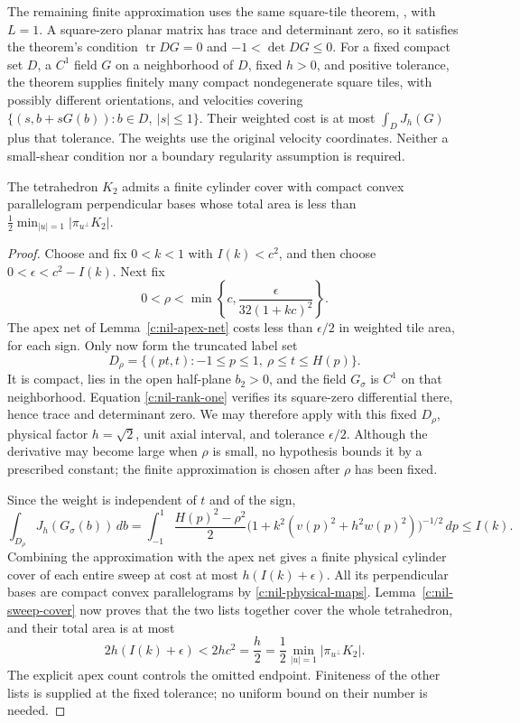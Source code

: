 The remaining finite approximation uses the same square-tile theorem,
\BNilpotent{}, with $L=1$. A square-zero planar matrix has trace and
determinant zero, so it satisfies the theorem's condition
$\operatorname{tr}DG=0$ and $-1<\det DG\le0$.
For a fixed compact set $D$, a $C^1$ field $G$ on a neighborhood of $D$,
fixed $h>0$, and positive tolerance, the theorem supplies finitely
many compact nondegenerate square tiles, with possibly different
orientations, and velocities covering
$\{(s,b+sG(b)):b\in D,\ |s|\le1\}$.
Their weighted cost is at most $\int_D J_h(G)$ plus that tolerance.
The weights use the original velocity coordinates. Neither a
small-shear condition nor a boundary regularity assumption is required.

\begin{proposition}\label{c:nil-finite-counterexample}
The tetrahedron $K_2$ admits a finite cylinder cover
with compact convex parallelogram perpendicular bases whose total
area is less than
$\frac12\min_{|u|=1}|\pi_{u^\perp}K_2|$.
\end{proposition}

\begin{proof}
Choose and fix $0<k<1$ with $I(k)<c^2$, and then choose
$0<\epsilon<c^2-I(k)$.  Next fix
\[
 0<\rho<\min\left\{c,\frac{\epsilon}{32(1+kc)^2}\right\}.
\]
The apex net of Lemma~\ref{c:nil-apex-net} costs less than
$\epsilon/2$ in weighted tile area, for each sign.
Only now form the truncated label set
\[
 D_\rho=\{(pt,t):-1\le p\le1,\ \rho\le t\le H(p)\}.
\]
It is compact, lies in the open half-plane $b_2>0$, and the field
$G_\sigma$ is $C^1$ on that neighborhood.  Equation
\eqref{c:nil-rank-one} verifies its square-zero differential there,
hence trace and determinant zero.
We may therefore apply \BNilpotent{}
with this fixed $D_\rho$, physical factor $h=\sqrt2$, unit axial
interval, and tolerance $\epsilon/2$.  Although the derivative
may become large when $\rho$ is small, no hypothesis bounds it by
a prescribed constant; the finite approximation is chosen after
$\rho$ has been fixed.

Since the weight is independent of $t$ and of the sign,
\[
 \int_{D_\rho}J_h(G_\sigma(b))\,db
 =\int_{-1}^1\frac{H(p)^2-\rho^2}{2}
   \bigl(1+k^2(v(p)^2+h^2w(p)^2)\bigr)^{-1/2}\,dp
 \le I(k).
\]
Combining the approximation with the apex net gives a finite
physical cylinder cover of each entire sweep at cost at most
$h(I(k)+\epsilon)$.  All its perpendicular bases are compact
convex parallelograms by \eqref{c:nil-physical-maps}.
Lemma~\ref{c:nil-sweep-cover} now proves that the two lists
together cover the whole tetrahedron, and their total area is at most
\[
 2h(I(k)+\epsilon)<2hc^2=\frac h2
 =\frac12\min_{|u|=1}|\pi_{u^\perp}K_2|.
\]
The explicit apex count controls the omitted endpoint.  Finiteness
of the other lists is supplied at the fixed tolerance; no uniform
bound on their number is needed.
\end{proof}
